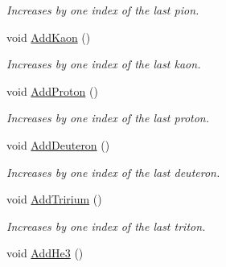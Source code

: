 \begin{DoxyCompactItemize}
\begin{DoxyCompactList}\small\item\em Increases by one index of the last pion. \end{DoxyCompactList}\item 
void \hyperlink{classKFPTrackVector_a1c6e6f58a2982ba21cd91c0220a75658}{Add\+Kaon} ()\hypertarget{classKFPTrackVector_a1c6e6f58a2982ba21cd91c0220a75658}{}\label{classKFPTrackVector_a1c6e6f58a2982ba21cd91c0220a75658}

\begin{DoxyCompactList}\small\item\em Increases by one index of the last kaon. \end{DoxyCompactList}\item 
void \hyperlink{classKFPTrackVector_a077d22809fc0c838519dd44a29fc86af}{Add\+Proton} ()\hypertarget{classKFPTrackVector_a077d22809fc0c838519dd44a29fc86af}{}\label{classKFPTrackVector_a077d22809fc0c838519dd44a29fc86af}

\begin{DoxyCompactList}\small\item\em Increases by one index of the last proton. \end{DoxyCompactList}\item 
void \hyperlink{classKFPTrackVector_a14b29123077ef34d96c2c00a841f06c8}{Add\+Deuteron} ()\hypertarget{classKFPTrackVector_a14b29123077ef34d96c2c00a841f06c8}{}\label{classKFPTrackVector_a14b29123077ef34d96c2c00a841f06c8}

\begin{DoxyCompactList}\small\item\em Increases by one index of the last deuteron. \end{DoxyCompactList}\item 
void \hyperlink{classKFPTrackVector_a5d6fb895a6d4d2855ce9d52f0e1dc904}{Add\+Tririum} ()\hypertarget{classKFPTrackVector_a5d6fb895a6d4d2855ce9d52f0e1dc904}{}\label{classKFPTrackVector_a5d6fb895a6d4d2855ce9d52f0e1dc904}

\begin{DoxyCompactList}\small\item\em Increases by one index of the last triton. \end{DoxyCompactList}\item 
void \hyperlink{classKFPTrackVector_aa30e5ef71bc23b237245858aec1639ef}{Add\+He3} ()\hypertarget{classKFPTrackVector_aa30e5ef71bc23b237245858aec1639ef}{}\label{classKFPTrackVector_aa30e5ef71bc23b237245858aec1639ef}


\end{DoxyCompactItemize}
